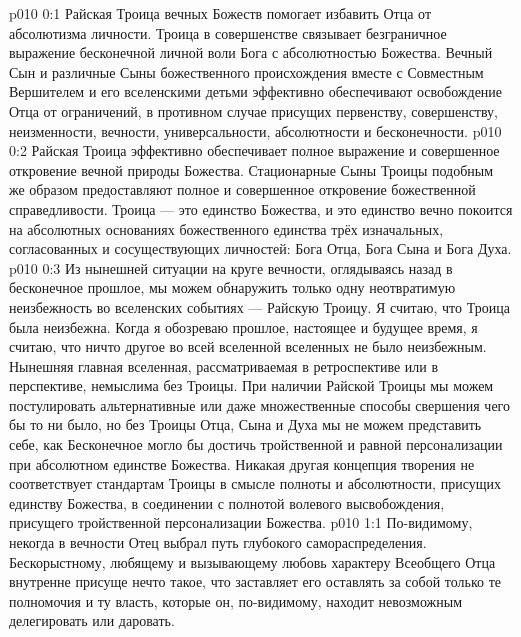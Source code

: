 \author{Всеобщий Цензор}
\vs p010 0:1 Райская Троица вечных Божеств помогает избавить Отца от абсолютизма личности. Троица в совершенстве связывает безграничное выражение бесконечной личной воли Бога с абсолютностью Божества. Вечный Сын и различные Сыны божественного происхождения вместе с Совместным Вершителем и его вселенскими детьми эффективно обеспечивают освобождение Отца от ограничений, в противном случае присущих первенству, совершенству, неизменности, вечности, универсальности, абсолютности и бесконечности.
\vs p010 0:2 Райская Троица эффективно обеспечивает полное выражение и совершенное откровение вечной природы Божества. Стационарные Сыны Троицы подобным же образом предоставляют полное и совершенное откровение божественной справедливости. Троица --- это единство Божества, и это единство вечно покоится на абсолютных основаниях божественного единства трёх изначальных, согласованных и сосуществующих личностей: Бога Отца, Бога Сына и Бога Духа.
\vs p010 0:3 \pc Из нынешней ситуации на круге вечности, оглядываясь назад в бесконечное прошлое, мы можем обнаружить только одну неотвратимую неизбежность во вселенских событиях --- Райскую Троицу. Я считаю, что Троица была неизбежна. Когда я обозреваю прошлое, настоящее и будущее время, я считаю, что ничто другое во всей вселенной вселенных не было неизбежным. Нынешняя главная вселенная, рассматриваемая в ретроспективе или в перспективе, немыслима без Троицы. При наличии Райской Троицы мы можем постулировать альтернативные или даже множественные способы свершения чего бы то ни было, но без Троицы Отца, Сына и Духа мы не можем представить себе, как Бесконечное могло бы достичь тройственной и равной персонализации при абсолютном единстве Божества. Никакая другая концепция творения не соответствует стандартам Троицы в смысле полноты и абсолютности, присущих единству Божества, в соединении с полнотой волевого высвобождения, присущего тройственной персонализации Божества.
\vs p010 1:1 По\hyp{}видимому, некогда в вечности Отец выбрал путь глубокого самораспределения. Бескорыстному, любящему и вызывающему любовь характеру Всеобщего Отца внутренне присуще нечто такое, что заставляет его оставлять за собой только те полномочия и ту власть, которые он, по\hyp{}видимому, находит невозможным делегировать или даровать.
